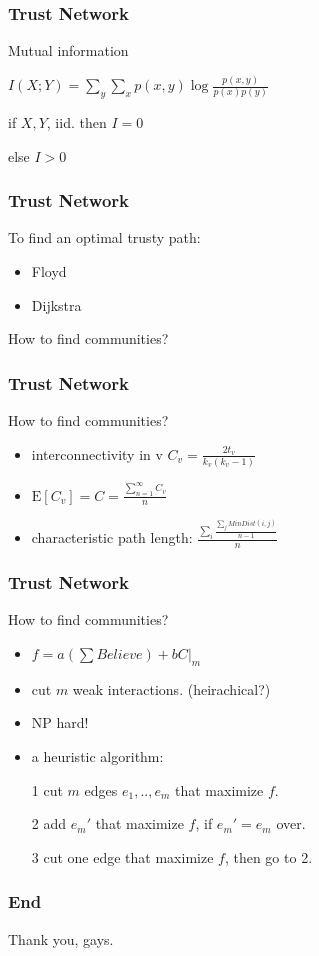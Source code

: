 \documentclass[professionalfonts]{beamer}
\begin{document}
\begin{frame}
\frametitle{Trust Network}
Mutual information

$I(X;Y) = \sum_y \sum_x  p(x,y) \log \frac{p(x,y)}{p(x)p(y)} $

if $X, Y$, iid. then $ I=0$

else $ I > 0 $
\end{frame}

\begin{frame}
\frametitle{Trust Network}
To find an optimal trusty path:
\begin{itemize}
\item Floyd
\item Dijkstra
\end{itemize}
How to find communities?
\end{frame}

\begin{frame}
\frametitle{Trust Network}
How to find communities?
\begin{itemize}
\item interconnectivity in v $C_v = \frac{2t_v}{k_v(k_v-1)} $
\item $\text{E}[C_v]=C=\frac{\sum_{n=1}^{\infty} C_v}{n} $
\item characteristic path length: $\frac{\sum_i \frac{\sum_j MinDist(i,j)}{n-1}  }{n} $
\end{itemize}
\end{frame}


\begin{frame}
\frametitle{Trust Network}
How to find communities?
\begin{itemize}
\item $ f = a \left( \sum Believe \right) + b C|_m $
\item cut $m$ weak interactions. (heirachical?)
\item {\color{red} NP hard!}
\item a heuristic algorithm:
 \item [1] cut $m$ edges $e_1,..,e_m$ that maximize $f$.
 \item [2]  add $e_m'$ that maximize $f$, if $e_m' =e_m$ over.
 \item [3] cut one edge that maximize $f$, then go to 2.
\end{itemize}
\end{frame}


\begin{frame}
\frametitle{End}
\Huge Thank you, gays.
\end{frame}
\end{document}

